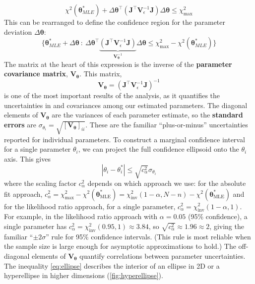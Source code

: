 \begin{equation}
    \chi^2(\boldsymbol{\theta}^*_{MLE}) + \Delta\boldsymbol{\theta}^\top \left( \mathbf{J}^\top \mathbf{V}_\epsilon^{-1} \mathbf{J} \right) \Delta\boldsymbol{\theta} \leq \chi^2_{\text{max}}
\end{equation}
This can be rearranged to define the confidence region for the parameter deviation $\Delta\boldsymbol{\theta}$:
\begin{equation}
    \{ \boldsymbol{\theta}^*_{MLE} + \Delta\boldsymbol{\theta} \ : \ \Delta\boldsymbol{\theta}^\top \underbrace{\left( \mathbf{J}^\top \mathbf{V}_\epsilon^{-1} \mathbf{J} \right)}_{\mathbf{V}_{\boldsymbol{\theta}}^{-1}} \Delta\boldsymbol{\theta} \leq \chi^2_{\text{max}} - \chi^2(\boldsymbol{\theta}^*_{MLE}) \}
    \label{eq:ellipse}
\end{equation}
The matrix at the heart of this expression is the inverse of the \textbf{parameter covariance matrix}, $\mathbf{V}_{\boldsymbol{\theta}}$. This matrix, 
\begin{equation}
    \mathbf{V}_{\boldsymbol{\theta}} = (\mathbf{J}^\top \mathbf{V}_\epsilon^{-1} \mathbf{J})^{-1}
    \label{eq:parameter-covariance-matrix}
\end{equation}
is one of the most important results of the analysis, as it quantifies the uncertainties in and covariances among our estimated parameters. The diagonal elements of $\mathbf{V}_{\boldsymbol{\theta}}$ are the variances of each parameter estimate, so the \textbf{standard errors} are $\sigma_{\theta_i} = \sqrt{[\mathbf{V}_{\boldsymbol{\theta}}]_{ii}}$. These are the familiar ``plus-or-minus'' uncertainties reported for individual parameters. To construct a marginal confidence interval for a single parameter $\theta_i$, we can project the full confidence ellipsoid onto the $\theta_i$ axis. This gives
\begin{equation}
    |\theta_i - \theta_i^*| \leq \sqrt{c_\alpha^2} \sigma_{\theta_i}
\end{equation}
where the scaling factor $c_\alpha^2$ depends on which approach we use: for the absolute fit approach, $c_\alpha^2 = \chi^2_{\text{max}} - \chi^2(\boldsymbol{\theta}^*_{\text{MLE}}) = \chi^2_{\text{inv}}(1-\alpha, N-n) - \chi^2(\boldsymbol{\theta}^*_{\text{MLE}})$ and for the likelihood ratio approach, for a single parameter, $c_\alpha^2 = \chi^2_{\text{inv}}(1-\alpha, 1)$. For example, in the likelihood ratio approach with $\alpha = 0.05$ (95\% confidence), a single parameter has $c_\alpha^2 = \chi^2_{\text{inv}}(0.95, 1) \approx 3.84$, so $\sqrt{c_\alpha^2} \approx 1.96 \approx 2$, giving the familiar ``$\pm 2\sigma$'' rule for 95\% confidence intervals. (This rule is most reliable when the sample size is large enough for asymptotic approximations to hold.) The off-diagonal elements of $\mathbf{V}_{\boldsymbol{\theta}}$ quantify correlations between parameter uncertainties. The inequality \autoref{eq:ellipse} describes the interior of an ellipse in 2D or a hyperellipse in higher dimensions (\autoref{fig:hyperellipse}).

